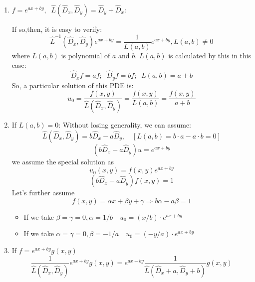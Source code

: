 \documentclass[10pt, a4paper, oneside]{ctexbook}
\begin{document}
\begin{enumerate}
    \item $f=e^{ax+by},\;\; \hat{L}\left(\hat{D}_{x}, \hat{D}_{y}\right)=\hat{D}_{y}+\hat{D}_{x}$:

          If so,then, it is easy to verify:
          $$
              \hat{L}^{-1}\left(\hat{D}_{x}, \hat{D}_{y}\right) e^{a x+b y}=\frac{1}{L(a, b)} e^{a x+b y}, L(a, b) \neq 0
          $$
          where $L(a,b)$ is polynomial of $a$ and $b$.
          $L(a,b)$ is calculated by this in this case:
          $$
              \hat{D}_{x} f = af;\;\;\hat{D}_{y} f= bf;\;\; L(a,b)=a+b
          $$
          So, a particular solution of this PDE is:
          $$
              u_0=\frac{f(x,y)}{\hat{L}\left(\hat{D}_{x}, \hat{D}_{y}\right)}=\frac{f(x,y)}{{L}\left(a,b\right)}=\frac{f(x,y)}{a+b}
          $$

    \item If $L(a,b)=0$:
          Without losing generality, we can assume:
          $$
              \hat{L}\left(\hat{D}_{x}, \hat{D}_{y}\right)=b \hat{D}_{x}-a \hat{D}_{y}, \quad[L(a, b)=b \cdot a-a \cdot b=0]
          $$
          $$\left(b \hat{D}_{x}-a \hat{D}_{y}\right) u=e^{a x+b y}$$
          we assume the special solution as
          $$u_{0}(x, y)=f(x, y) e^{a x+b y}$$
          $$\left(b \hat{D}_{x}-a \hat{D}_{y}\right) f(x, y)=1$$
          Let's further assume
          $$f(x, y)=\alpha x+\beta y+\gamma \Rightarrow b \alpha-a \beta=1$$
          \begin{itemize}
              \item If we take $\beta=\gamma=0, \alpha=1 / b \quad u_{0}=(x / b) \cdot e^{a x+b y}$
              \item If we take $\alpha=\gamma=0, \beta=-1 / a \quad u_{0}=(-y / a) \cdot e^{a x+b y}$
          \end{itemize}

    \item If $f=e^{ax+by}g(x,y)$
          $$
              \frac{ 1}{\hat{L}\left(\hat{D}_{x}, \hat{D}_{y}\right)} e^{a x+b y} g(x, y)=e^{a x+b y} \frac{1}{\hat{L}\left(\hat{D}_{x}+a, \hat{D}_{y}+b\right)} g(x, y)
          $$
\end{enumerate}
\end{document}
